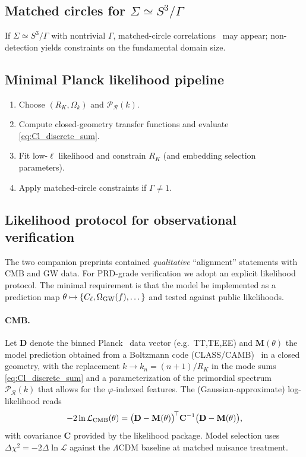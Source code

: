 \documentclass[
  reprint,
  amsmath,amssymb,
  aps,
  prd,
  superscriptaddress,
  nofootinbib,
  longbibliography
]{revtex4-2}
\newcommand{\phig}{\varphi}
\newcommand{\Sthree}{S^{3}}
\newcommand{\Sig}{\Sigma}
\theoremstyle{definition}
\theoremstyle{remark}
\begin{document}
\subsection{\texorpdfstring{Matched circles for $\Sig\simeq \Sthree/\Gamma$}{Matched circles for Sigma ≃ S3/Gamma}}
If $\Sig\simeq \Sthree/\Gamma$ with nontrivial $\Gamma$, matched-circle correlations~\cite{CornishSpergelStarkman1998,Planck2015Topology} may appear; non-detection yields
constraints on the fundamental domain size.

\subsection{Minimal Planck likelihood pipeline}
\begin{enumerate}
\item Choose $(R_K,\Omega_k)$ and $\mathcal P_{\mathcal R}(k)$.
\item Compute closed-geometry transfer functions and evaluate \eqref{eq:Cl_discrete_sum}.
\item Fit low-$\ell$ likelihood and constrain $R_K$ (and embedding selection parameters).
\item Apply matched-circle constraints if $\Gamma\neq 1$.
\end{enumerate}


\subsection{Likelihood protocol for observational verification}
\label{sec:likelihood-protocol}

The two companion preprints contained \emph{qualitative} ``alignment'' statements with CMB and GW data.
For PRD-grade verification we adopt an explicit likelihood protocol. The minimal requirement is that
the model be implemented as a prediction map $\theta\mapsto \{C_\ell,\Omega_{\rm GW}(f),\dots\}$ and
tested against public likelihoods.

\paragraph{CMB.}
Let $\mathbf{D}$ denote the binned Planck~\cite{Planck2018Cosmo,Planck2018Lik} data vector (e.g.\ TT,TE,EE) and $\mathbf{M}(\theta)$ the model
prediction obtained from a Boltzmann code (CLASS/CAMB)~\cite{Blas2011CLASS,Lewis2000CAMB} in a closed geometry, with the replacement $k\to k_n=(n+1)/R_K$
in the mode sums \eqref{eq:Cl_discrete_sum} and a parameterization of the primordial spectrum
$\mathcal{P}_{\mathcal{R}}(k)$ that allows for the $\phig$-indexed features.
The (Gaussian-approximate) log-likelihood reads
\begin{equation}
-2\ln\mathcal{L}_{\rm CMB}(\theta)=
\big(\mathbf{D}-\mathbf{M}(\theta)\big)^{\!\top}\mathbf{C}^{-1}
\big(\mathbf{D}-\mathbf{M}(\theta)\big),
\label{eq:lnL_CMB}
\end{equation}
with covariance $\mathbf{C}$ provided by the likelihood package.
Model selection uses $\Delta\chi^2=-2\Delta\ln\mathcal{L}$ against the $\Lambda$CDM baseline at matched
nuisance treatment.
\end{document}
